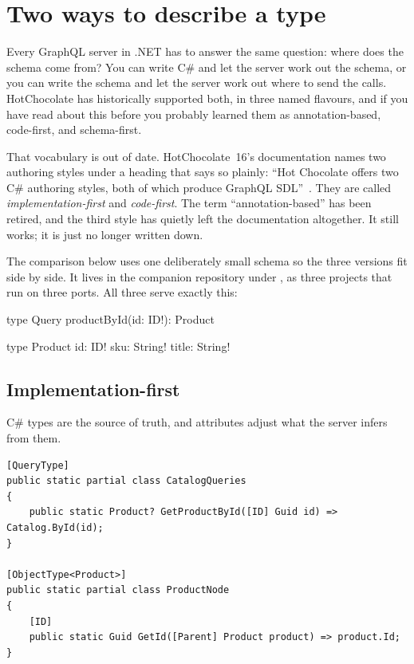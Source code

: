 \section{Two ways to describe a type}
\label{sec:ch02-two-ways}

Every GraphQL server in .NET has to answer the same question: where does the
schema come from? You can write C\# and let the server work out the schema, or
you can write the schema and let the server work out where to send the calls.
HotChocolate has historically supported both, in three named flavours, and if
you have read about this before you probably learned them as annotation-based,
code-first, and schema-first.

That vocabulary is out of date. HotChocolate~16's documentation names two
authoring styles under a heading that says so plainly: \enquote{Hot Chocolate
offers two C\# authoring styles, both of which produce GraphQL
SDL}~\autocite{chillicream2026typesystem}. They are called
\emph{implementation-first} and \emph{code-first}. The term
\enquote{annotation-based} has been retired, and the third style has quietly
left the documentation altogether. It still works; it is just no longer written
down.

The comparison below uses one deliberately small schema so the three versions
fit side by side. It lives in the companion repository under
, as three projects that run on three ports. All
three serve exactly this:

\begin{graphqlsdl}
type Query {
  productById(id: ID!): Product
}

type Product {
  id: ID!
  sku: String!
  title: String!
}
\end{graphqlsdl}

\subsection*{Implementation-first}

%
C\# types are the source of truth, and attributes adjust what the server infers
from them.

\begin{verbatim}
[QueryType]
public static partial class CatalogQueries
{
    public static Product? GetProductById([ID] Guid id) => Catalog.ById(id);
}

[ObjectType<Product>]
public static partial class ProductNode
{
    [ID]
    public static Guid GetId([Parent] Product product) => product.Id;
}
\end{verbatim}


